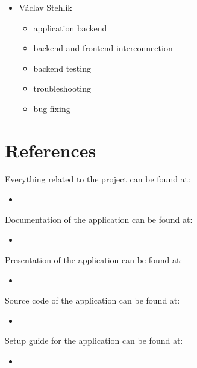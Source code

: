 \documentclass[11pt,a4paper]{article}
\begin{document}
\begin{itemize}
    \item Václav Stehlík
    \begin{itemize}
        \item application backend
        \item backend and frontend interconnection
        \item backend testing
        \item troubleshooting
        \item bug fixing
    \end{itemize}
\end{itemize}

\section{References}\label{sec:references}

Everything related to the project can be found at:
\begin{itemize}
    \item \href{https://github.com/europ/MUNI-FI-PA181}{\color{urlColor}{github.com/europ/MUNI-FI-PA181}}
\end{itemize}

Documentation of the application can be found at:
\begin{itemize}
    \item \href{https://github.com/europ/MUNI-FI-PA181/blob/master/doc/doc.pdf}{\color{urlColor}{github.com/europ/MUNI-FI-PA181/blob/master/doc/doc.pdf}}
\end{itemize}

Presentation of the application can be found at:
\begin{itemize}
    \item \href{https://github.com/europ/MUNI-FI-PA181/blob/master/pres/pres.pdf}{\color{urlColor}{github.com/europ/MUNI-FI-PA181/blob/master/pres/pres.pdf}}
\end{itemize}

Source code of the application can be found at:
\begin{itemize}
    \item \href{https://github.com/europ/MUNI-FI-PA181/tree/master/src}{\color{urlColor}{github.com/europ/MUNI-FI-PA181/tree/master/src}}
\end{itemize}

Setup guide for the application can be found at:
\begin{itemize}
    \item \href{https://github.com/europ/MUNI-FI-PA181/wiki/Setup}{\color{urlColor}{github.com/europ/MUNI-FI-PA181/wiki/Setup}}
\end{itemize}
\end{document}
